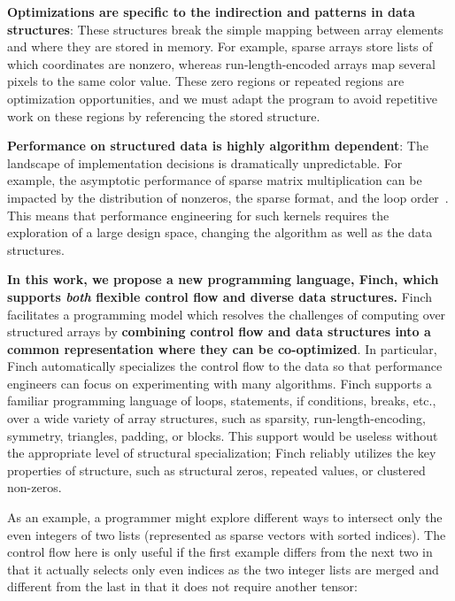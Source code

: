 \textbf{Optimizations are specific to the indirection and patterns in data structures}: 
%
These structures break the simple mapping between array elements and where they are stored in memory.
%
For example, sparse arrays store lists of which coordinates are nonzero, whereas run-length-encoded arrays map several pixels to the same color value. 
%
These zero regions or repeated regions are optimization opportunities, and we must adapt the program to avoid repetitive work on these regions by referencing the stored structure.

\textbf{Performance on structured data is highly algorithm dependent}: The landscape of implementation decisions is dramatically unpredictable. 
%
For example, the asymptotic performance of sparse matrix multiplication can be impacted by the distribution of nonzeros, the sparse format, and the loop order~\cite{ahrens2022autoscheduling, zhang2021gamma}. 
This means that performance engineering for such kernels requires the exploration of a large design space, changing the algorithm as well as the data structures.



\textbf{In this work, we propose a new programming language, Finch, which supports \textit{both} flexible control flow and diverse data structures.}
%
Finch facilitates a programming model which resolves the challenges of computing over structured arrays by \textbf{combining control flow and data structures into a common representation where they can be co-optimized}.
%
In particular, Finch automatically specializes the control flow to the data so that performance engineers can focus on experimenting with many algorithms.
%
Finch supports a familiar programming language of loops, statements, if conditions, breaks, etc., over a wide variety of array structures, such as sparsity, run-length-encoding, symmetry, triangles, padding, or blocks. 
%
This support would be useless without the appropriate level of structural specialization; Finch reliably utilizes the key properties of structure, such as structural zeros, repeated values, or clustered non-zeros.
%

As an example, a programmer might explore different ways to intersect only the even integers of two lists (represented as sparse vectors with sorted indices). The control flow here is only useful if the first example differs from the next two in that it actually selects only even indices as the two integer lists are merged and different from the last in that it does not require another tensor:

